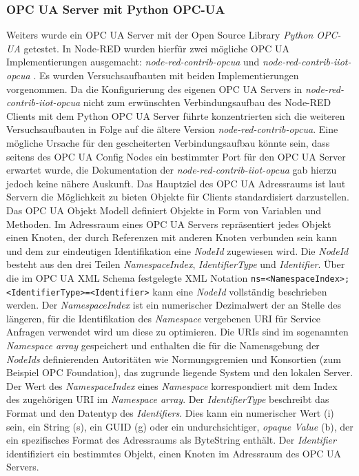 \documentclass[BMR,Bachelor,ngerman]{twbook}%
\begin{document}
\subsubsection{OPC UA Server mit Python OPC-UA}
Weiters wurde ein OPC UA Server mit der Open Source Library \emph{Python OPC-UA} \cite{pythonopcua2018} getestet. In Node-RED wurden hierfür zwei mögliche \ac{OPC UA} Implementierungen ausgemacht: \emph{node-red-contrib-opcua} \cite{node-red-opcua} und \emph{node-red-contrib-iiot-opcua} \cite{node-red-iiot-opcua}. Es wurden Versuchsaufbauten mit beiden Implementierungen vorgenommen. Da die Konfigurierung des eigenen \ac{OPC UA} Servers in \emph{node-red-contrib-iiot-opcua} nicht zum erwünschten Verbindungsaufbau des Node-RED Clients mit dem Python OPC UA Server führte konzentrierten sich die weiteren Versuchsaufbauten in Folge auf die ältere Version \emph{node-red-contrib-opcua}. Eine mögliche Ursache für den gescheiterten Verbindungsaufbau könnte sein, dass seitens des OPC UA Config Nodes ein bestimmter Port für den OPC UA Server erwartet wurde, die Dokumentation der \emph{node-red-contrib-iiot-opcua} gab hierzu jedoch keine nähere Auskunft.%
%
 Das Hauptziel des OPC UA Adressraums ist laut  Servern die Möglichkeit zu bieten Objekte für Clients standardisiert darzustellen. Das OPC UA Objekt Modell definiert Objekte in Form von Variablen und Methoden. Im Adressraum eines \ac{OPC UA} Servers repräsentiert jedes Objekt einen Knoten, der durch Referenzen mit anderen Knoten verbunden sein kann und dem zur eindeutigen Identifikation eine \emph{NodeId} zugewiesen wird. Die \emph{NodeId} besteht aus den drei Teilen \emph{NamespaceIndex}, \emph{IdentifierType} und \emph{Identifier}. Über die im \ac{OPC UA} \ac{XML} Schema festgelegte \ac{XML} Notation \verb+ns=<NamespaceIndex>;<IdentifierType>=<Identifier>+ kann eine \emph{NodeId} vollständig beschrieben werden. Der \emph{NamespaceIndex} ist ein numerischer Dezimalwert der an Stelle des längeren, für die Identifikation des \emph{Namespace} vergebenen \ac{URI} für Service Anfragen verwendet wird um diese zu optimieren. Die \acp{URI} sind im sogenannten \emph{Namespace array} gespeichert und enthalten die für die Namensgebung der \emph{NodeIds} definierenden Autoritäten wie Normungsgremien und Konsortien (zum Beispiel OPC Foundation), das zugrunde liegende System und den lokalen Server. Der Wert des \emph{NamespaceIndex} eines \emph{Namespace} korrespondiert mit dem Index des zugehörigen \ac{URI} im  \emph{Namespace array}. Der \emph{IdentifierType} beschreibt das Format und den Datentyp des \emph{Identifiers}. Dies kann ein numerischer Wert (i) sein, ein String (s), ein \ac{GUID} (g) oder ein undurchsichtiger, \emph{opaque Value} (b), der ein spezifisches Format des Adressraums als ByteString enthält. Der \emph{Identifier} identifiziert ein bestimmtes Objekt, einen Knoten im Adressraum des \ac{OPC UA} Servers.
\end{document}
